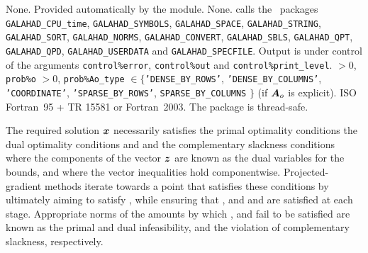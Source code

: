 \documentclass{galahad}
\newcommand{\packagename}{BLLS}
\begin{document}

\galgeneral

\galcommon None.
\galworkspace Provided automatically by the module.
\galroutines None.
\galmodules {\tt \packagename\_solve} calls the \galahad\ packages
{\tt GALAHAD\_CPU\_time},
{\tt GALAHAD\_SY\-M\-BOLS}, \newline
{\tt GALAHAD\_SPACE},
{\tt GALAHAD\_STRING},
{\tt GALAHAD\_SORT},
{\tt GALAHAD\_NORMS},
{\tt GALAHAD\_CONVERT},
{\tt GALAHAD\_SBLS}, \newline
{\tt GALAHAD\_QPT},
{\tt GALAHAD\_QPD},
{\tt GALAHAD\_USERDATA} and
{\tt GALAHAD\_SPECFILE}.
\galio Output is under control of the arguments
 {\tt control\%error}, {\tt control\%out} and {\tt control\%print\_level}.
 $> 0$, {\tt prob\%o} $> 0$,
{\tt prob\%Ao\_type} $\in \{${\tt 'DENSE\_BY\_ROWS'}, 
{\tt 'DENSE\_BY\_COLUMNS'}, {\tt 'COORDINATE'}, 
{\tt 'SPARSE\_BY\_\-ROWS'},  {\tt SPARSE\_BY\_COLUMNS} $\}$
(if ${\bm{A}}_o$ is explicit).
\galportability ISO Fortran~95 + TR 15581 or Fortran~2003.
The package is thread-safe.


\galmethod
The required solution ${\bm{x}}$ necessarily satisfies
the primal optimality conditions
the dual optimality conditions
and
and the complementary slackness conditions
where the components of the vector ${\bm{z}}$ are known as
the dual variables for the bounds,
and where the vector inequalities hold componentwise.
Projected-gradient methods iterate towards a point
that satisfies these conditions by ultimately aiming to satisfy
, while ensuring that
, and  and  are satisfied at each stage.
Appropriate norms of the amounts by
which ,  and  fail to be satisfied are known as the
primal and dual infeasibility, and the violation of complementary slackness,
respectively.
\end{document}
